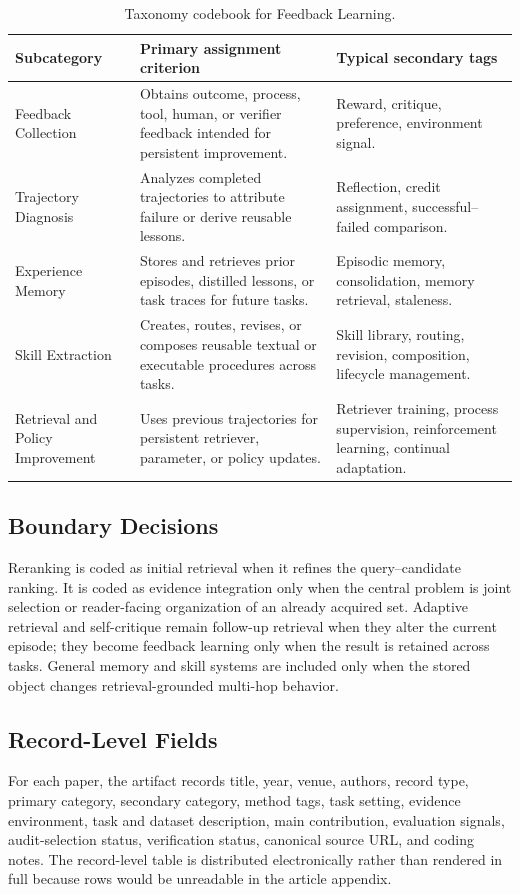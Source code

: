 \begin{table}[tbp]
\centering
\caption{Taxonomy codebook for Feedback Learning.}
\label{tab:taxonomy_feedback}
\footnotesize
\begin{tabularx}{\linewidth}{@{}p{2.7cm}Y Y@{}}
\toprule
Subcategory & Primary assignment criterion & Typical secondary tags \\
\midrule
Feedback Collection & Obtains outcome, process, tool, human, or verifier feedback intended for persistent improvement. & Reward, critique, preference, environment signal. \\
Trajectory Diagnosis & Analyzes completed trajectories to attribute failure or derive reusable lessons. & Reflection, credit assignment, successful--failed comparison. \\
Experience Memory & Stores and retrieves prior episodes, distilled lessons, or task traces for future tasks. & Episodic memory, consolidation, memory retrieval, staleness. \\
Skill Extraction & Creates, routes, revises, or composes reusable textual or executable procedures across tasks. & Skill library, routing, revision, composition, lifecycle management. \\
Retrieval and Policy Improvement & Uses previous trajectories for persistent retriever, parameter, or policy updates. & Retriever training, process supervision, reinforcement learning, continual adaptation. \\
\bottomrule
\end{tabularx}
\end{table}

\subsection{Boundary Decisions}
Reranking is coded as initial retrieval when it refines the query--candidate ranking. It is coded as evidence integration only when the central problem is joint selection or reader-facing organization of an already acquired set. Adaptive retrieval and self-critique remain follow-up retrieval when they alter the current episode; they become feedback learning only when the result is retained across tasks. General memory and skill systems are included only when the stored object changes retrieval-grounded multi-hop behavior.

\subsection{Record-Level Fields}
For each paper, the artifact records title, year, venue, authors, record type, primary category, secondary category, method tags, task setting, evidence environment, task and dataset description, main contribution, evaluation signals, audit-selection status, verification status, canonical source URL, and coding notes. The record-level table is distributed electronically rather than rendered in full because \CorpusSize{} rows would be unreadable in the article appendix.
